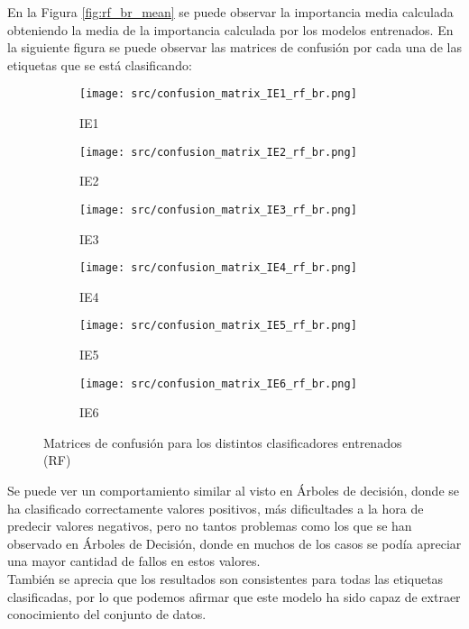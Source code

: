 En la Figura \ref{fig:rf_br_mean} se puede observar  la importancia media calculada obteniendo la media de la importancia calculada por los modelos entrenados.
\clearpage
En la siguiente figura se puede observar las matrices de confusión por cada una de las etiquetas que se está clasificando:
\begin{figure}[H]
	\centering
	\begin{subfigure}[b]{0.3\textwidth}
		\centering
		\texttt{[image: src/confusion\_matrix\_IE1\_rf\_br.png]}
		\caption{IE1}
	\end{subfigure}
	\hfill
	\begin{subfigure}[b]{0.3\textwidth}
		\centering
		\texttt{[image: src/confusion\_matrix\_IE2\_rf\_br.png]}
		\caption{IE2}
	\end{subfigure}
	\hfill
	\begin{subfigure}[b]{0.3\textwidth}
		\centering
		\texttt{[image: src/confusion\_matrix\_IE3\_rf\_br.png]}
		\caption{IE3}
	\end{subfigure}
	\hfill
	\begin{subfigure}[b]{0.3\textwidth}
		\centering
		\texttt{[image: src/confusion\_matrix\_IE4\_rf\_br.png]}
		\caption{IE4}
	\end{subfigure}
	\hfill
	\begin{subfigure}[b]{0.3\textwidth}
		\centering
		\texttt{[image: src/confusion\_matrix\_IE5\_rf\_br.png]}
		\caption{IE5}
	\end{subfigure}
	\hfill
	\begin{subfigure}[b]{0.3\textwidth}
		\centering
		\texttt{[image: src/confusion\_matrix\_IE6\_rf\_br.png]}
		\caption{IE6}
	\end{subfigure}
	\caption{Matrices de confusión para los distintos clasificadores entrenados (RF)}
	\label{fig:ml_conf_matrix_rf}
\end{figure}
Se puede ver un comportamiento similar al visto en Árboles de decisión, donde se ha clasificado correctamente valores positivos, más dificultades a la hora de predecir valores negativos, pero no tantos problemas como los que se han observado en Árboles de Decisión, donde en muchos de los casos se podía apreciar una mayor cantidad de fallos en estos valores.\\
\linebreak
También se aprecia que los resultados son consistentes para todas las etiquetas clasificadas, por lo que podemos afirmar que este modelo ha sido capaz de extraer conocimiento del conjunto de datos.
\clearpage
